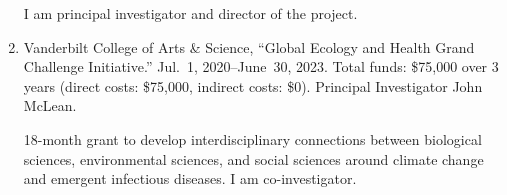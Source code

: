 \begin{enumerate}
\begin{credit}
I am principal investigator and director of the project.
\end{credit}
%
%
\item Vanderbilt College of Arts \& Science,
``Global Ecology and Health Grand Challenge Initiative.''
Jul.~1, 2020--June~30, 2023.
Total funds: \$75,000 over 3 years (direct costs: \$75,000, indirect costs: \$0).
Principal Investigator John McLean.
\begin{credit}
18-month grant to develop interdisciplinary connections between biological sciences, environmental sciences, and social sciences around climate change and emergent infectious diseases.
I am co-investigator.
\end{credit}
\end{enumerate}
%
\iffalse
\subsubsection{Pending Grant Proposals}
\fi
%
